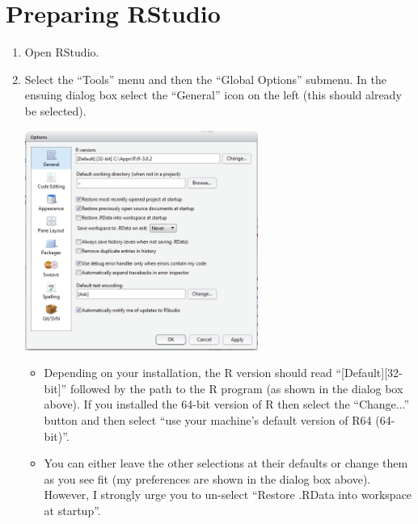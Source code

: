 \documentclass{article}\usepackage[]{graphicx}\usepackage[]{color}
\begin{document}
\section{Preparing RStudio}
\begin{enumerate}
  \item Open RStudio.

  \item Select the ``Tools'' menu and then the ``Global Options'' submenu.  In the ensuing dialog box select the ``General'' icon on the left (this should already be selected).
\begin{center}
  \includegraphics[width=3in]{Figs/RStudio_Prep_OptionsGeneral.png}
\end{center}
  \begin{itemize}
    \item Depending on your installation, the R version should read ``[Default][32-bit]'' followed by the path to the R program (as shown in the dialog box above).  If you installed the 64-bit version of R then select the ``Change...'' button and then select ``use your machine's default version of R64 (64-bit)''.
    \item You can either leave the other selections at their defaults or change them as you see fit (my preferences are shown in the dialog box above).  However, I strongly urge you to un-select ``Restore .RData into workspace at startup''.
  \end{itemize}


\end{enumerate}
\end{document}
